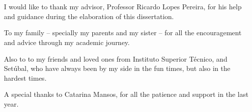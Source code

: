 \chapter*{\acknowledgments}


I would like to thank my advisor, Professor Ricardo Lopes Pereira, for his help and guidance during the elaboration of this dissertation.

To my family – specially my parents and my sister – for all the encouragement and advice through my academic journey.

Also to to my friends and loved ones from Instituto Superior Técnico, and Setúbal, who have always been by my side in the fun times, but also in the hardest times.

A special thanks to Catarina Mansos, for all the patience and support in the last year.


\cleardoublepage

